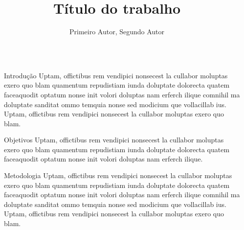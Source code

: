 \documentclass[final]{beamer}
\title{Título do trabalho} %
\author{Primeiro Autor, Segundo Autor} %
\institute{Instituição do Primeiro Autor, Instituição do Segundo Autor} %
\newlength{\sepmargin}
\newlength{\onecolwid}
\begin{document}
\setlength{\belowcaptionskip}{2ex} %
\setlength\belowdisplayshortskip{1ex} %

\begin{frame}[t] %

	\begin{columns}[t] %

		\begin{column}{\sepmargin}
		\end{column}



		\begin{column}{\onecolwid} %

			\begin{block}{Introdução} %
				Uptam, offictibus rem vendipici nonsecest la cullabor moluptas exero quo blam quamentum repudistiam iunda doluptate dolorecta quatem faceaquodit optatum nonse init volori doluptas nam erferch ilique comnihil ma doluptate sanditat ommo temquia nonse sed modicium que vollacillab ius. Uptam, offictibus rem vendipici nonsecest la cullabor moluptas exero quo blam.
			\end{block}

			\begin{block}{Objetivos}
				Uptam, offictibus rem vendipici nonsecest la cullabor moluptas exero quo blam quamentum repudistiam iunda doluptate dolorecta quatem faceaquodit optatum nonse init volori doluptas nam erferch ilique.
			\end{block}

			\begin{block}{Metodologia}
				Uptam, offictibus rem vendipici nonsecest la cullabor moluptas exero quo blam quamentum repudistiam iunda doluptate dolorecta quatem faceaquodit optatum nonse init volori doluptas nam erferch ilique comnihil ma doluptate sanditat ommo temquia nonse sed modicium que vollacillab ius. Uptam, offictibus rem vendipici nonsecest la cullabor moluptas exero quo blam.
			\end{block}


\end{column}
\end{columns}
\end{frame}
\end{document}
